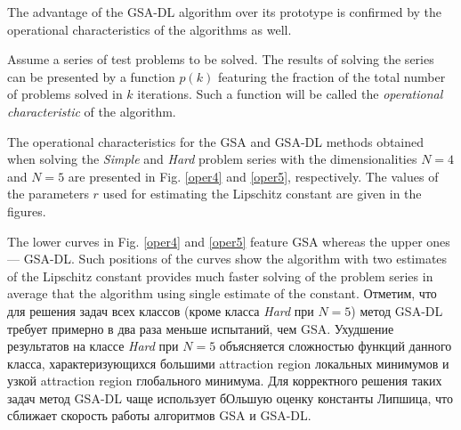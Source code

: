 \documentclass[runningheads]{llncs}
\begin{document}
The advantage of the GSA-DL algorithm over its prototype is confirmed by the operational characteristics of the algorithms as well. 

Assume a series of test problems to be solved. The results of solving the series can be presented by a function $p(k)$ featuring the fraction of the total number of problems solved in $k$ iterations. Such a function will be called the \textit{operational characteristic} of the algorithm. 

The operational characteristics for the GSA and GSA-DL methods obtained when solving the \textit{Simple} and \textit{Hard} problem series with the dimensionalities $N=4$ and $N=5$ are presented in Fig. \ref{oper4} and \ref{oper5}, respectively. The values of the parameters $r$ used for estimating the Lipschitz constant are given in the figures.

The lower curves in Fig. \ref{oper4} and \ref{oper5} feature GSA whereas the upper ones --- GSA-DL. Such positions of the curves show the algorithm with two estimates of the Lipschitz constant provides much faster solving of the problem series in average that the algorithm using single estimate of the constant.
Отметим, что для решения задач всех классов (кроме класса  \textit{Hard} при $N=5$) метод GSA-DL требует примерно в два раза меньше испытаний, чем GSA. Ухудшение результатов на классе \textit{Hard} при $N=5$ объясняется сложностью функций данного класса, характеризующихся большими attraction region локальных минимумов и узкой attraction region глобального минимума. Для корректного решения таких задач метод  GSA-DL чаще использует бОльшую оценку константы Липшица, что сближает скорость работы алгоритмов GSA и GSA-DL.

%




\end{document}
